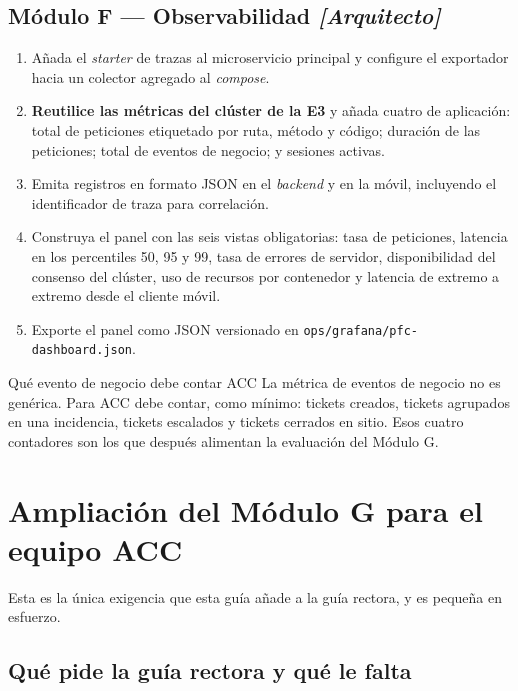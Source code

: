 \documentclass[11pt,a4paper]{article}
\begin{document}
\subsection{Módulo F --- Observabilidad \emph{[Arquitecto]}}

\begin{enumerate}[leftmargin=*,itemsep=3pt]
	\item Añada el \emph{starter} de trazas al microservicio principal y configure el exportador hacia un colector agregado al \emph{compose}.
	\item \textbf{Reutilice las métricas del clúster de la E3} y añada cuatro de aplicación: total de peticiones etiquetado por ruta, método y código; duración de las peticiones; total de eventos de negocio; y sesiones activas.
	\item Emita registros en formato JSON en el \emph{backend} y en la móvil, incluyendo el identificador de traza para correlación.
	\item Construya el panel con las seis vistas obligatorias: tasa de peticiones, latencia en los percentiles 50, 95 y 99, tasa de errores de servidor, disponibilidad del consenso del clúster, uso de recursos por contenedor y latencia de extremo a extremo desde el cliente móvil.
	\item Exporte el panel como JSON versionado en \texttt{ops/grafana/\allowbreak pfc-dashboard.json}.
\end{enumerate}

\begin{defBox}{Qué evento de negocio debe contar ACC}
	La métrica de eventos de negocio no es genérica. Para ACC debe contar, como mínimo: tickets creados, tickets agrupados en una incidencia, tickets escalados y tickets cerrados en sitio. Esos cuatro contadores son los que después alimentan la evaluación del Módulo G.
\end{defBox}

\section{Ampliación del Módulo G para el equipo ACC}

Esta es la única exigencia que esta guía añade a la guía rectora, y es pequeña en esfuerzo.

\subsection{Qué pide la guía rectora y qué le falta}
\end{document}
